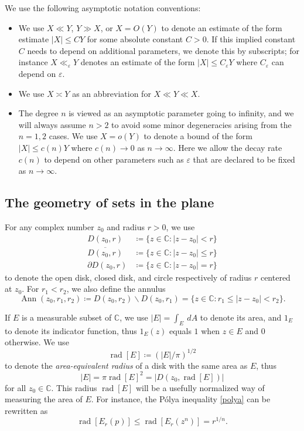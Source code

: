 \documentclass[12pt]{amsart}
\newcommand{\eps}{\varepsilon}
\newcommand{\C}{\mathbb{C}}
\renewcommand{\r}{\operatorname{rad}}
\newcommand{\Ann}{\operatorname{Ann}}
\begin{document}
We use the following asymptotic notation conventions:
\begin{itemize}
    \item We use $X \ll Y$, $Y \gg X$, or $X = O(Y)$ to denote an estimate of the form estimate $|X| \leq C Y$ for some absolute constant $C>0$.  If this implied constant $C$ needs to depend on additional parameters, we denote this by subscripts; for instance $X \ll_\eps Y$ denotes an estimate of the form $|X| \leq C_\eps Y$ where $C_\eps$ can depend on $\eps$.
    \item We use $X \asymp Y$ as an abbreviation for $X \ll Y \ll X$.
    \item The degree $n$ is viewed as an asymptotic parameter going to infinity, and we will always assume $n>2$ to avoid some minor degeneracies arising from the $n=1,2$ cases.  We use $X = o(Y)$ to denote a bound of the form $|X| \leq c(n) Y$ where $c(n) \to 0$ as $n \to \infty$.  Here we allow the decay rate $c(n)$ to depend on other parameters such as $\eps$ that are declared to be fixed as $n \to \infty$.
\end{itemize}

\subsection{The geometry of sets in the plane}

For any complex number $z_0$ and radius $r>0$, we use
\begin{align*}
D(z_0,r) &\coloneqq \{ z \in \C: |z-z_0| < r \}\\
\overline{D(z_0,r)} &\coloneqq \{ z \in \C: |z-z_0| \leq r \}\\
\partial D(z_0,r) &\coloneqq \{ z \in \C: |z-z_0| = r \}
\end{align*}
to denote the open disk, closed disk, and circle respectively of radius $r$ centered at $z_0$.  For $r_1 < r_2$, we also define the annulus
$$ \Ann(z_0,r_1,r_2) \coloneqq D(z_0,r_2) \backslash D(z_0,r_1) = \{ z \in \C: r_1 \leq |z-z_0| < r_2 \}.$$

If $E$ is a measurable subset of $\C$, we use $|E| = \int_E\ dA$ to denote its area, and $1_E$ to denote its indicator function, thus $1_E(z)$ equals $1$ when $z \in E$ and $0$ otherwise.  We use
\begin{equation}\label{rE-def}
    \r[E] \coloneqq (|E|/\pi)^{1/2}
\end{equation}
to denote the \emph{area-equivalent radius} of a disk with the same area as $E$, thus
\begin{equation}\label{E-area}
    |E| = \pi \r[E]^2 = |D(z_0,\r[E])|
\end{equation}
for all $z_0 \in \C$.  This radius $\r[E]$ will be a usefully normalized way of measuring the area of $E$.  For instance, the P\'olya inequality \eqref{polya} can be rewritten as
\begin{equation}\label{polya-r}
    \r[E_r(p)] \leq \r[E_r(z^n)] = r^{1/n}.
\end{equation}
\end{document}

